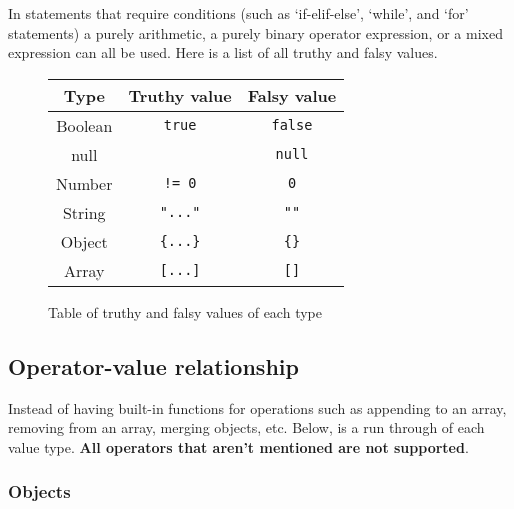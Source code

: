 \documentclass[12pt, letterpaper]{article}
\begin{document}
In statements that require conditions (such as `if-elif-else', `while', and `for' statements) a purely arithmetic, a purely binary operator expression, or a mixed expression can all be used. Here is a list of all truthy and falsy values.

\begin{figure}[H]
    \begin{center}
        \begin{tabular}{| c | c | c |}
            \hline
            Type & Truthy value & Falsy value\\
            \hline
            Boolean & \verb|true| & \verb|false|\\
            \hline
            null & & \verb|null|\\
            \hline
            Number & \verb|!= 0| & \verb|0|\\
            \hline
            String & \verb|"..."| & \verb|""|\\
            \hline
            Object & \verb|{...}| & \verb|{}|\\
            \hline
            Array & \verb|[...]| & \verb|[]|\\
            \hline
        \end{tabular}
    \end{center}
    \caption{Table of truthy and falsy values of each type}
\end{figure}

\subsection{Operator-value relationship}
\label{sec:operatorvaluerel}

Instead of having built-in functions for operations such as appending to an array, removing from an array, merging objects, etc. Below, is a run through of each value type. \textbf{All operators that aren't mentioned are not supported}.

\subsubsection{Objects}
\end{document}
